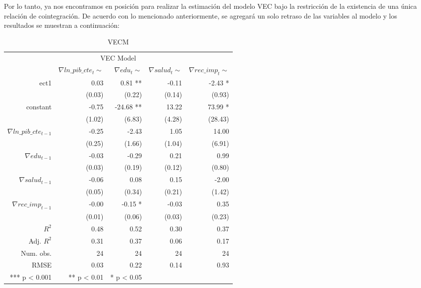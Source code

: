 Por lo tanto, ya nos encontramos en posición para realizar la estimación del modelo VEC bajo la restricción de la existencia de una única relación de cointegración. De acuerdo con lo mencionado anteriormente, se agregará un solo retraso de las variables al modelo y los resultados se muestran a continuación:


\begin{table}[H]
\begin{center}
    \begin{tabular}{rrrrr}
    \hline
    \multicolumn{5}{c}{VEC Model } \\
        \cline{1-5}
        			  				& $\nabla ln\_pib\_cte_t \sim$		 	& $\nabla edu_t \sim$			  	& $\nabla salud_t \sim$	& $\nabla rec\_imp_t \sim$  \\
        \hline
        ect1						&	0.03 							&	0.81 **  						&	-0.11     			&	-2.43 *	\\
        							&	(0.03) 						&	(0.22)   						&	(0.14)  			&	(0.93) 	\\
        constant					&	-0.75							&	-24.68 **   					&	13.22    			&	73.99 *	\\
        							&	(1.02) 						&	(6.83)  						&	(4.28)  			&	(28.43) 	\\
        $\nabla ln\_pib\_cte_{t-1}$		&	-0.25							&	-2.43 						&	1.05				&	14.00 	\\
        							&	(0.25)						&	(1.66)   						&	(1.04) 			&	(6.91)  	\\
         $\nabla edu_{t-1}$			&	-0.03							&	-0.29 						&	0.21 				&	0.99   	\\
        							&	(0.03) 						&	(0.19)						&	(0.12)			&	(0.80)	\\
        $\nabla salud_{t-1}$			&	-0.06							&	0.08   						&	0.15   			&	-2.00		\\
        							&	(0.05)						&	(0.34)						&	(0.21)   			&	(1.42) 	\\
        $\nabla rec\_imp_{t-1}$		&	-0.00							&	-0.15 * 						&	-0.03     			&	0.35		\\
        							&	(0.01) 						&	(0.06)   						&	(0.03)   			&	(0.23)	\\
	\cline{1-5}
	$R^2$					&	0.48   						&	0.52     						&	0.30        			&	0.37  	\\
	Adj. $R^2$				&	0.31    						&	0.37         						&	0.06            		&	0.17   	\\
	Num. obs. 				&	24   							&	24      						&	24       			&	24	 	\\
	RMSE					&	0.03   						&	0.22           					&	0.14           		&	0.93  	\\
	\cline{1-5}
	*** p < 0.001				&	 ** p < 0.01					&	* p < 0.05						&					&			\\
        \hline
    \end{tabular}
\end{center}
\caption {VECM} \label{tab:VECM_est} 
\end{table}


